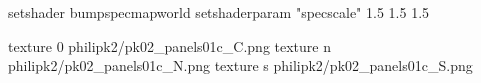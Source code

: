 setshader bumpspecmapworld
setshaderparam "specscale" 1.5 1.5 1.5

texture 0 philipk2/pk02_panels01c_C.png
texture n philipk2/pk02_panels01c_N.png
texture s philipk2/pk02_panels01c_S.png

